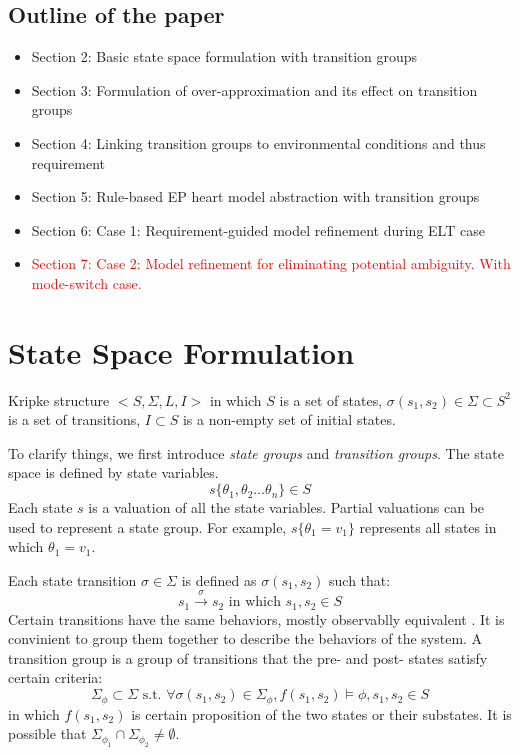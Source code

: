 \documentclass{llncs}
\begin{document}
\subsection{Outline of the paper}
\begin{itemize}
	\item Section 2: Basic state space formulation with transition groups
    \item Section 3: Formulation of over-approximation and its effect on transition groups
    \item Section 4: Linking transition groups to environmental conditions and thus requirement
    \item Section 5: Rule-based EP heart model abstraction with transition groups
    \item Section 6: Case 1: Requirement-guided model refinement during ELT case 
    \item\textcolor{red}{ Section 7: Case 2: Model refinement for eliminating potential ambiguity. With mode-switch case.} 
\end{itemize}

%


\section{State Space Formulation}
Kripke structure $<S,\Sigma,L,I>$ in which $S$ is a set of states, $\sigma(s_1,s_2)\in\Sigma\subset S^2$ is a set of transitions, $I\subset S$ is a non-empty set of initial states.

To clarify things, we first introduce \emph{state groups} and \emph{transition groups}. The state space is defined by state variables. 
$$s\{\theta_1,\theta_2\dots \theta_n\}\in S$$
Each state $s$ is a valuation of all the state variables. Partial valuations can be used to represent a state group. For example, $s\{\theta_1=v_1\}$ represents all states in which $\theta_1=v_1$.

Each state transition $\sigma\in\Sigma$ is defined as $\sigma(s_1,s_2)$ such that:
$$s_1\xrightarrow{\sigma}s_2\text{ in which }s_1,s_2\in S$$
Certain transitions have the same behaviors, mostly observablly equivalent . It is convinient to group them together to describe the behaviors of the system. A \textsf{transition group} is a group of transitions that the pre- and post- states satisfy certain criteria:
$$\Sigma_\phi\subset\Sigma \text{ s.t. }\forall\sigma(s_1,s_2)\in\Sigma_\phi,f(s_1,s_2)\models\phi,s_1,s_2\in S$$
in which $f(s_1,s_2)$ is certain proposition of the two states or their substates. It is possible that $\Sigma_{\phi_1}\cap\Sigma_{\phi_2}\neq \emptyset$.
\end{document}

